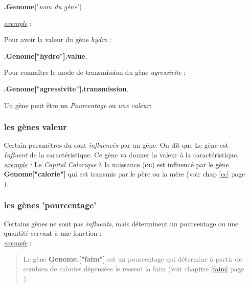 \documentclass[french]{report}
\newlength{\du}\fi
\begin{document}
\begin{center}
	\textbf{.Genome}["\textit{nom du gène}"]\\
\end{center}

\textit{\underline{exemple}} :

Pour avoir la valeur du gène \emph{hydro} : 
\begin{center}
	\textbf{.Genome["hydro"].value}.\\
\end{center}

Pour connaître le mode de transmission du gène \emph{agressivite} : 

\begin{center}
	\textbf{.Genome["agressivite"].transmission}.\\
\end{center}

Un gène peut être un \textit{Pourcentage} ou \textit{une valeur}:

\subsubsection{les gènes valeur}
Certain paramètres du \CoCiX sont \textit{influencés} par un gène. On dit que Le gène est \textit{Influent} de la caractéristique. Ce gène va donner la valeur à la caractéristique.\\

\textit{\underline{exemple} :}
Le \textit{Capital Calorique} à la naissance (\textbf{cc}) est influencé par le gène \textbf{Genome["calorie"]} qui est transmis par le père ou la mère (voir chap \ref{cc} page \pageref{cc}).\\

\subsubsection{les gènes 'pourcentage'}
Certains gènes ne sont pas \textit{influents}, mais déterminent un pourcentage  ou une quantité servant à une fonction : \\

\textit{\underline{exemple}} :
\begin{quote}
	Le gène \textbf{Genome.["faim"]} est un pourcentage qui détermine à partir de combien de calories dépensées le \CoCiX ressent la faim (voir chapitre \ref{faim} page \pageref{faim}).\\
\end{quote}
\end{document}
